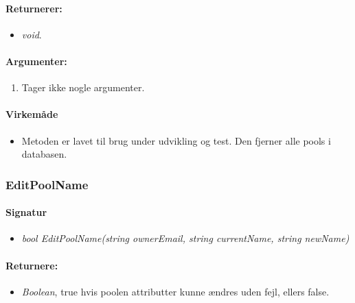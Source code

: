\paragraph{Returnerer:}
\begin{itemize}
	\item \textit{void}.
\end{itemize}

\paragraph{Argumenter:}
\begin{enumerate}
	\item Tager ikke nogle argumenter.
\end{enumerate}

\paragraph{Virkemåde}
\begin{itemize}
	\item Metoden er lavet til brug under udvikling og test. Den fjerner alle pools i databasen.
\end{itemize}






\subsubsection{EditPoolName}%





\paragraph{Signatur}
\begin{itemize}
	\item \textit{bool EditPoolName(string ownerEmail, string currentName, string newName)}
\end{itemize}

\paragraph{Returnere:}
\begin{itemize}
	\item \textit{Boolean}, true hvis poolen attributter kunne ændres uden fejl, ellers false.
\end{itemize}

